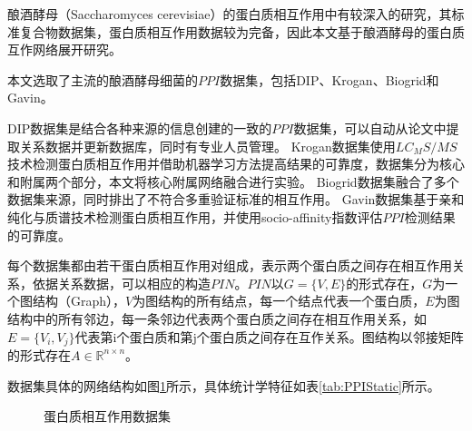 酿酒酵母（Saccharomyces cerevisiae）的蛋白质相互作用中有较深入的研究，其标准复合物数据集，蛋白质相互作用数据较为完备，因此本文基于酿酒酵母的蛋白质互作网络展开研究。

本文选取了主流的酿酒酵母细菌的$PPI$数据集，包括DIP\cite{salwinski_database_2004}、Krogan\cite{krogan_global_2006}、Biogrid\cite{stark_biogrid_2006}和Gavin\cite{gavin_proteome_2006}。

DIP数据集是结合各种来源的信息创建的一致的$PPI$数据集，可以自动从论文中提取关系数据并更新数据库，同时有专业人员管理。
Krogan数据集使用$LC_MS/MS$技术检测蛋白质相互作用并借助机器学习方法提高结果的可靠度，数据集分为核心和附属两个部分，本文将核心附属网络融合进行实验。
Biogrid数据集融合了多个数据集来源，同时排出了不符合多重验证标准的相互作用。
Gavin数据集基于亲和纯化与质谱技术检测蛋白质相互作用，并使用socio-affinity指数评估$PPI$检测结果的可靠度。

每个数据集都由若干蛋白质相互作用对组成，表示两个蛋白质之间存在相互作用关系，依据关系数据，可以相应的构造$PIN$。$PIN$以$G=\{V,E\}$的形式存在，$G$为一个图结构（Graph），$V$为图结构的所有结点，每一个结点代表一个蛋白质，$E$为图结构中的所有邻边，每一条邻边代表两个蛋白质之间存在相互作用关系，如$E=\{V_i,V_j\}$代表第i个蛋白质和第j个蛋白质之间存在互作关系。图结构以邻接矩阵的形式存在$A\in \mathbb{R}^{n\times n}$。

数据集具体的网络结构如图\ref{fig:ppi-datasets}所示，具体统计学特征如表\ref{tab:PPIStatic}所示。

\begin{figure}[htbp]
    \centering
    \vskip0.5cm
    \vskip0.5cm
    \vskip0.5cm
    \caption{蛋白质相互作用数据集}
    \label{fig:ppi-datasets}
\end{figure}


